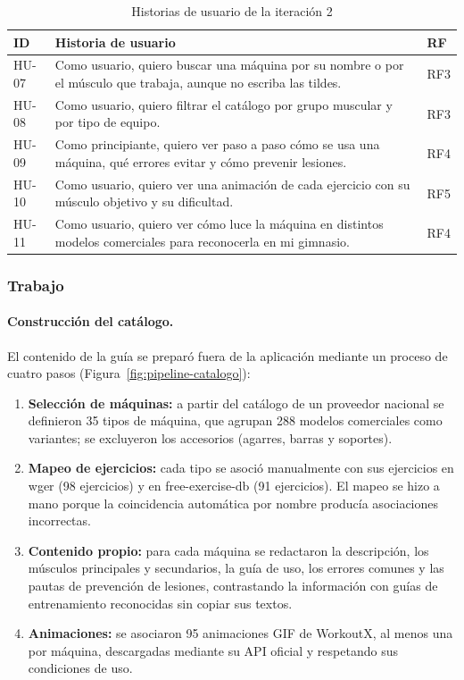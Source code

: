 \begin{table}[H]
\centering
\caption{Historias de usuario de la iteración 2}
\label{tab:hu-it2}
\begin{tabularx}{\textwidth}{|L{1.2cm}|Y|L{1.5cm}|}
\hline
{} \textbf{ID} & \textbf{Historia de usuario} & \textbf{RF} \\
\hline
HU-07 & Como usuario, quiero buscar una máquina por su nombre o por el músculo
que trabaja, aunque no escriba las tildes. & RF3 \\ \hline
HU-08 & Como usuario, quiero filtrar el catálogo por grupo muscular y por tipo
de equipo. & RF3 \\ \hline
HU-09 & Como principiante, quiero ver paso a paso cómo se usa una máquina, qué
errores evitar y cómo prevenir lesiones. & RF4 \\ \hline
HU-10 & Como usuario, quiero ver una animación de cada ejercicio con su
músculo objetivo y su dificultad. & RF5 \\ \hline
HU-11 & Como usuario, quiero ver cómo luce la máquina en distintos modelos
comerciales para reconocerla en mi gimnasio. & RF4 \\
\hline
\end{tabularx}
\end{table}

\subsubsection{Trabajo}

\paragraph{Construcción del catálogo.} El contenido de la guía se preparó
fuera de la aplicación mediante un proceso de cuatro pasos
(Figura~\ref{fig:pipeline-catalogo}):

\begin{enumerate}
    \item \textbf{Selección de máquinas:} a partir del catálogo de un
    proveedor nacional se definieron 35 tipos de máquina, que agrupan 288
    modelos comerciales como variantes; se excluyeron los accesorios
    (agarres, barras y soportes).
    \item \textbf{Mapeo de ejercicios:} cada tipo se asoció manualmente con
    sus ejercicios en wger (98 ejercicios) y en free-exercise-db (91
    ejercicios). El mapeo se hizo a mano porque la coincidencia automática por
    nombre producía asociaciones incorrectas.
    \item \textbf{Contenido propio:} para cada máquina se redactaron la
    descripción, los músculos principales y secundarios, la guía de uso, los
    errores comunes y las pautas de prevención de lesiones, contrastando la
    información con guías de entrenamiento reconocidas sin copiar sus textos.
    \item \textbf{Animaciones:} se asociaron 95 animaciones GIF de WorkoutX,
    al menos una por máquina, descargadas mediante su API oficial y
    respetando sus condiciones de uso.
\end{enumerate}

